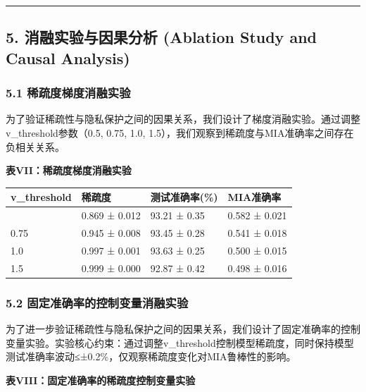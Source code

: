 \documentclass[
]{article}
\begin{document}
\begin{center}\rule{0.5\linewidth}{0.5pt}\end{center}

\subsection{5. 消融实验与因果分析 (Ablation Study and Causal
Analysis)}\label{ux6d88ux878dux5b9eux9a8cux4e0eux56e0ux679cux5206ux6790-ablation-study-and-causal-analysis}

\subsubsection{5.1
稀疏度梯度消融实验}\label{ux7a00ux758fux5ea6ux68afux5ea6ux6d88ux878dux5b9eux9a8c}

为了验证稀疏性与隐私保护之间的因果关系，我们设计了梯度消融实验。通过调整v\_threshold参数（0.5,
0.75, 1.0, 1.5），我们观察到稀疏度与MIA准确率之间存在负相关关系。

\textbf{表VII：稀疏度梯度消融实验}

\begin{longtable}[]{@{}llll@{}}
\toprule\noalign{}
v\_threshold & 稀疏度 & 测试准确率(\%) & MIA准确率 \\
\midrule\noalign{}
\endhead
\bottomrule\noalign{}
\endlastfoot
0.5 & 0.869 ± 0.012 & 93.21 ± 0.35 & 0.582 ± 0.021 \\
0.75 & 0.945 ± 0.008 & 93.45 ± 0.28 & 0.541 ± 0.018 \\
1.0 & 0.997 ± 0.001 & 93.63 ± 0.25 & 0.500 ± 0.015 \\
1.5 & 0.999 ± 0.000 & 92.87 ± 0.42 & 0.498 ± 0.016 \\
\end{longtable}

\subsubsection{5.2
固定准确率的控制变量消融实验}\label{ux56faux5b9aux51c6ux786eux7387ux7684ux63a7ux5236ux53d8ux91cfux6d88ux878dux5b9eux9a8c}

为了进一步验证稀疏性与隐私保护之间的因果关系，我们设计了固定准确率的控制变量实验。实验核心约束：通过调整v\_threshold控制模型稀疏度，同时保持模型测试准确率波动≤±0.2\%，仅观察稀疏度变化对MIA鲁棒性的影响。

\textbf{表VIII：固定准确率的稀疏度控制变量实验}
\end{document}

